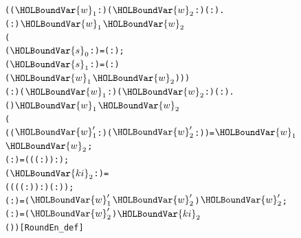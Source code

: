 \documentclass{article}
\begin{document}
\begin{alltt}
\HOLTokenTurnstile{} (\HOLSymConst{\HOLTokenForall{}}(\ensuremath{\HOLBoundVar{w}\sb{\mathrm{1}}} :) (\ensuremath{\HOLBoundVar{w}\sb{\mathrm{2}}} :) ( : ).
       ( :) \ensuremath{\HOLBoundVar{w}\sb{\mathrm{1}}} \ensuremath{\HOLBoundVar{w}\sb{\mathrm{2}}}  \HOLSymConst{=}
      (
         (\ensuremath{\HOLBoundVar{s}\sb{\mathrm{0}}} :) =  ( :) ;
         (\ensuremath{\HOLBoundVar{s}\sb{\mathrm{1}}} :) =  ( :) 
         (\ensuremath{\HOLBoundVar{w}\sb{\mathrm{1}}}\HOLSymConst{,}\ensuremath{\HOLBoundVar{w}\sb{\mathrm{2}}}))) \HOLSymConst{\HOLTokenConj{}}
   \HOLSymConst{\HOLTokenForall{}}( :) (\ensuremath{\HOLBoundVar{w}\sb{\mathrm{1}}} :) (\ensuremath{\HOLBoundVar{w}\sb{\mathrm{2}}} :) ( : ).
      ( ) \ensuremath{\HOLBoundVar{w}\sb{\mathrm{1}}} \ensuremath{\HOLBoundVar{w}\sb{\mathrm{2}}}  \HOLSymConst{=}
     (
        ((\ensuremath{\HOLBoundVar{w}\sb{\mathrm{1}}\sp{\prime{}}} :)\HOLSymConst{,}(\ensuremath{\HOLBoundVar{w}\sb{\mathrm{2}}\sp{\prime{}}} :)) =   \ensuremath{\HOLBoundVar{w}\sb{\mathrm{1}}} \ensuremath{\HOLBoundVar{w}\sb{\mathrm{2}}} ;
        ( :) =  ((( :) \HOLSymConst{\HOLTokenProd{}}  ) :) ;
        (\ensuremath{\HOLBoundVar{ki}\sb{\mathrm{2}}} :) =
           (((( :) \HOLSymConst{\HOLTokenProd{}}  ) :) \HOLSymConst{\ensuremath{+}} ( :)) ;
        ( :) = (\ensuremath{\HOLBoundVar{w}\sb{\mathrm{1}}\sp{\prime{}}} \HOLSymConst{\HOLTokenEor{}} \ensuremath{\HOLBoundVar{w}\sb{\mathrm{2}}\sp{\prime{}}}) \HOLSymConst{\HOLTokenRol{}}  \ensuremath{\HOLBoundVar{w}\sb{\mathrm{2}}\sp{\prime{}}} \HOLSymConst{\ensuremath{+}} ;
        ( :) = (\ensuremath{\HOLBoundVar{w}\sb{\mathrm{2}}\sp{\prime{}}} \HOLSymConst{\HOLTokenEor{}} ) \HOLSymConst{\HOLTokenRol{}}   \HOLSymConst{\ensuremath{+}} \ensuremath{\HOLBoundVar{ki}\sb{\mathrm{2}}}
        (\HOLSymConst{,}))\hfill{[RoundEn_def]}
\end{alltt}
\end{document}
